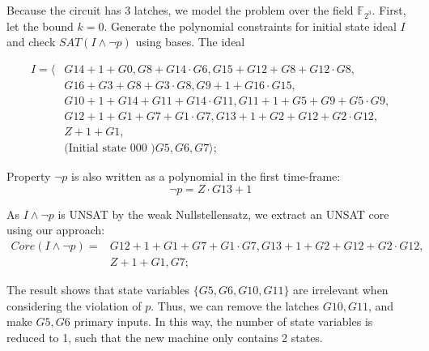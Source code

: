 \begin{Example}
Because the circuit has 3 latches, we model the problem over the field
${\mathbb{F}}_{2^3}$. First, let the bound $k = 0$. Generate the
polynomial constraints for initial state ideal $I$ and check $SAT(I\land
\neg p)$ using \Grobner bases. The ideal 

\begin{align*}
I = \langle & G14+1+G0, G8+G14\cdot G6, G15+G12+G8+G12\cdot G8,\\ 
	& G16+G3+G8+G3\cdot G8, G9+1+G16\cdot G15, \\ 
	& G10+1+G14+G11+G14\cdot G11, G11+1+G5+G9+G5\cdot G9, \\
	& G12+1+G1+G7+G1\cdot G7, G13+1+G2+G12+G2\cdot G12, \\
	& Z+1+G1, \\
	& \text{(Initial state 000 )} G5, G6, G7 \rangle;
\end{align*}

Property $\neg p$ is also written as a polynomial in the first
time-frame: 
\begin{equation*}
\neg p = Z\cdot G13 + 1
\end{equation*}

As $I\land \neg p$ is UNSAT by the weak
Nullstellensatz, we extract an UNSAT core using our approach:
\begin{align*}
Core(I\land \neg p) =& G12+1+G1+G7+G1\cdot G7, G13+1+G2+G12+G2\cdot G12, \\
& Z+1+G1, G7;
\end{align*}

The result shows that state variables $\{G5,G6, G10,G11\}$ are
irrelevant when considering the violation of $p$. Thus, we can remove
the latches $G10, G11$, and make $G5,G6$ primary inputs. In this way,
the number of state variables is reduced to 1, such that the new
machine only contains 2 states. 

\begin{figure}[H]
\end{figure}


\end{Example}

